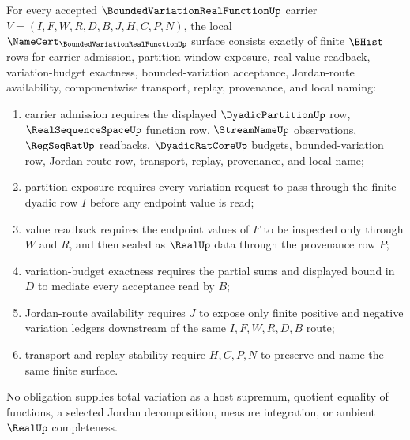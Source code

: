 \begin{theorem}
\label{thm:bounded-variation-real-function-namecert-obligations}
For every accepted $\BoundedVariationRealFunctionUp$ carrier $V=(I,F,W,R,D,B,J,H,C,P,N)$, the local $\NameCert_{\BoundedVariationRealFunctionUp}$ surface consists exactly of finite $\BHist$ rows for carrier admission, partition-window exposure, real-value readback, variation-budget exactness, bounded-variation acceptance, Jordan-route availability, componentwise transport, replay, provenance, and local naming:
\begin{enumerate}
\item carrier admission requires the displayed $\DyadicPartitionUp$ row, $\RealSequenceSpaceUp$ function row, $\StreamNameUp$ observations, $\RegSeqRatUp$ readbacks, $\DyadicRatCoreUp$ budgets, bounded-variation row, Jordan-route row, transport, replay, provenance, and local name;
\item partition exposure requires every variation request to pass through the finite dyadic row $I$ before any endpoint value is read;
\item value readback requires the endpoint values of $F$ to be inspected only through $W$ and $R$, and then sealed as $\RealUp$ data through the provenance row $P$;
\item variation-budget exactness requires the partial sums and displayed bound in $D$ to mediate every acceptance read by $B$;
\item Jordan-route availability requires $J$ to expose only finite positive and negative variation ledgers downstream of the same $I,F,W,R,D,B$ route;
\item transport and replay stability require $H,C,P,N$ to preserve and name the same finite surface.
\end{enumerate}
No obligation supplies total variation as a host supremum, quotient equality of functions, a selected Jordan decomposition, measure integration, or ambient $\RealUp$ completeness.
\end{theorem}

